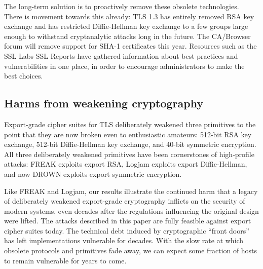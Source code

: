 The long-term solution is to proactively remove these obsolete technologies.
There is movement towards this already: TLS 1.3 has entirely removed RSA key
exchange and has restricted Diffie-Hellman key exchange to a few groups large
enough to withstand cryptanalytic attacks long in the future. The CA/Browser
forum will remove support for SHA-1 certificates this year. Resources such as
the SSL Labs SSL Reports have gathered information about best practices and
vulnerabilities in one place, in order to encourage administrators to make
the best choices.

\subsection{Harms from weakening cryptography}

Export-grade cipher suites for TLS deliberately weakened three primitives to
the point that they are now broken even to enthusiastic amateurs: 512-bit RSA
key exchange, 512-bit Diffie-Hellman key exchange, and 40-bit symmetric
encryption. All three deliberately weakened primitives have been cornerstones
of high-profile attacks: FREAK exploits export RSA, Logjam exploits export
Diffie-Hellman, and now DROWN exploits export symmetric encryption.

Like FREAK and Logjam, our results illustrate the continued harm that a
legacy of deliberately weakened export-grade cryptography inflicts on the
security of modern systems, even decades after the regulations influencing
the original design were lifted. The attacks described in this paper are
fully feasible against export cipher suites today. The technical debt induced
by cryptographic ``front doors'' has left implementations vulnerable for
decades. With the slow rate at which obsolete protocols and primitives fade
away, we can expect some fraction of hosts to remain vulnerable for years to
come.

